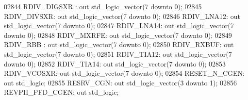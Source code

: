 \begin{DoxyCode}
02844     RDIV\_DIGSXR :   \textcolor{keywordflow}{out} \textcolor{comment}{std\_logic\_vector}(\textcolor{vhdllogic}{}\textcolor{vhdllogic}{7} \textcolor{keywordflow}{downto} \textcolor{vhdllogic}{}\textcolor{vhdllogic}{0});
02845     RDIV\_DIVSXR:    \textcolor{keywordflow}{out} \textcolor{comment}{std\_logic\_vector}(\textcolor{vhdllogic}{}\textcolor{vhdllogic}{7} \textcolor{keywordflow}{downto} \textcolor{vhdllogic}{}\textcolor{vhdllogic}{0});
02846     RDIV\_LNA12: \textcolor{keywordflow}{out} \textcolor{comment}{std\_logic\_vector}(\textcolor{vhdllogic}{}\textcolor{vhdllogic}{7} \textcolor{keywordflow}{downto} \textcolor{vhdllogic}{}\textcolor{vhdllogic}{0});
02847     RDIV\_LNA14: \textcolor{keywordflow}{out} \textcolor{comment}{std\_logic\_vector}(\textcolor{vhdllogic}{}\textcolor{vhdllogic}{7} \textcolor{keywordflow}{downto} \textcolor{vhdllogic}{}\textcolor{vhdllogic}{0});
02848     RDIV\_MXRFE: \textcolor{keywordflow}{out} \textcolor{comment}{std\_logic\_vector}(\textcolor{vhdllogic}{}\textcolor{vhdllogic}{7} \textcolor{keywordflow}{downto} \textcolor{vhdllogic}{}\textcolor{vhdllogic}{0});
02849     RDIV\_RBB :  \textcolor{keywordflow}{out} \textcolor{comment}{std\_logic\_vector}(\textcolor{vhdllogic}{}\textcolor{vhdllogic}{7} \textcolor{keywordflow}{downto} \textcolor{vhdllogic}{}\textcolor{vhdllogic}{0});
02850     RDIV\_RXBUF: \textcolor{keywordflow}{out} \textcolor{comment}{std\_logic\_vector}(\textcolor{vhdllogic}{}\textcolor{vhdllogic}{7} \textcolor{keywordflow}{downto} \textcolor{vhdllogic}{}\textcolor{vhdllogic}{0});
02851     RDIV\_TIA12: \textcolor{keywordflow}{out} \textcolor{comment}{std\_logic\_vector}(\textcolor{vhdllogic}{}\textcolor{vhdllogic}{7} \textcolor{keywordflow}{downto} \textcolor{vhdllogic}{}\textcolor{vhdllogic}{0});
02852     RDIV\_TIA14: \textcolor{keywordflow}{out} \textcolor{comment}{std\_logic\_vector}(\textcolor{vhdllogic}{}\textcolor{vhdllogic}{7} \textcolor{keywordflow}{downto} \textcolor{vhdllogic}{}\textcolor{vhdllogic}{0});
02853     RDIV\_VCOSXR:    \textcolor{keywordflow}{out} \textcolor{comment}{std\_logic\_vector}(\textcolor{vhdllogic}{}\textcolor{vhdllogic}{7} \textcolor{keywordflow}{downto} \textcolor{vhdllogic}{}\textcolor{vhdllogic}{0});
02854     RESET\_N\_CGEN:   \textcolor{keywordflow}{out} \textcolor{comment}{std\_logic};
02855     RESRV\_CGN:  \textcolor{keywordflow}{out} \textcolor{comment}{std\_logic\_vector}(\textcolor{vhdllogic}{}\textcolor{vhdllogic}{3} \textcolor{keywordflow}{downto} \textcolor{vhdllogic}{}\textcolor{vhdllogic}{1});
02856     REVPH\_PFD\_CGEN: \textcolor{keywordflow}{out} \textcolor{comment}{std\_logic};

\end{DoxyCode}
